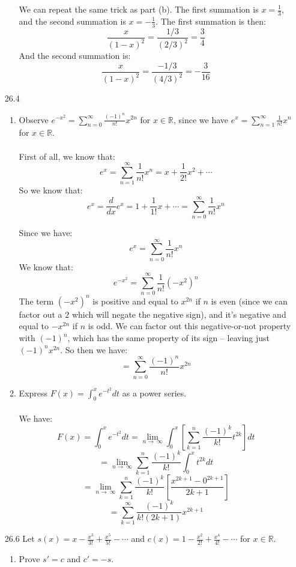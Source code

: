 \begin{enumerate}
\begin{enumerate}
        We can repeat the same trick as part (b). The first summation is $x = \frac{1}{3}$, and the second summation is $x = -\frac{1}{3}$. The first summation is then:
        $$\frac{x}{(1-x)^2} = \frac{1/3}{(2/3)^2} = \frac{3}{4}$$
        And the second summation is:
        $$\frac{x}{(1-x)^2} = \frac{-1/3}{(4/3)^2} = -\frac{3}{16}$$
    \end{enumerate}
  \item [26.4]
    \begin{enumerate}
      \item Observe $e^{-x^2} = \sum_{n=0}^\infty \frac{(-1)^n}{n!} x^{2n}$ for $x \in \mathds{R}$, since we have $e^x = \sum_{n=1}^\infty \frac{1}{n!} x^n$ for $x \in \mathds{R}$.\\\\

        First of all, we know that:
        $$e^x = \sum_{n=1}^\infty \frac{1}{n!} x^n = x + \frac{1}{2!}x^2 + \cdots$$
        So we know that:
        $$e^x = \frac{d}{dx} e^x = 1 + \frac{1}{1!}x + \cdots = \sum_{n=0}^\infty \frac{1}{n!} x^n$$
        

        Since we have:
        $$e^x = \sum_{n=0}^\infty \frac{1}{n!} x^n$$
        We know that:
        $$e^{-x^2} = \sum_{n=0}^\infty \frac{1}{n!} (-x^2)^n$$
        The term $(-x^2)^n$ is positive and equal to $x^{2n}$ if $n$ is even (since we can factor out a $2$ which will negate the negative sign), and it's negative and equal to $-x^{2n}$ if $n$ is odd. We can factor out this negative-or-not property with $(-1)^n$, which has the same property of its sign -- leaving just $(-1)^n x^{2n}$. So then we have:
        $$=\sum_{n=0}^\infty \frac{(-1)^n}{n!} x^{2n}$$

      \item Express $F(x) = \int_{0}^x e^{-t^2} dt$ as a power series.\\\\

        We have:
        $$F(x) = \int_0^x e^{-t^2} dt = \lim_{n \to\ \infty} \int_0^x [\sum_{k=1}^n \frac{(-1)^k}{k!} t^{2k}] dt$$
        $$=\lim_{n \to\ \infty} \sum_{k=1}^n \frac{(-1)^k}{k!} \int_0^x t^{2k} dt$$
        $$=\lim_{n \to\ \infty} \sum_{k=1}^n \frac{(-1)^k}{k!} [\frac{x^{2k+1} - 0^{2k+1}}{2k+1}]$$
        $$=\sum_{k=1}^\infty \frac{(-1)^k}{k! (2k+1)} x^{2k+1}$$
    \end{enumerate}
  \item [26.6]
    Let $s(x) = x - \frac{x^3}{3!} + \frac{x^5}{5!} - \cdots$ and $c(x) = 1 - \frac{x^2}{2!} + \frac{x^4}{4!} - \cdots$ for $x \in \mathds{R}$.
    \begin{enumerate}
      \item Prove $s' = c$ and $c' = -s$.\\\\


\end{enumerate}
\end{enumerate}
